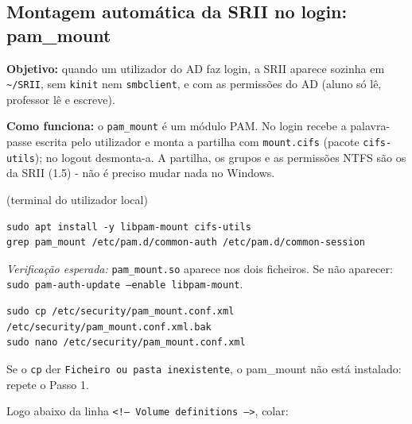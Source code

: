 
\subsection[Montagem automática da SRII no login: pam\_mount]{Montagem automática da SRII no login: pam\_mount}


\textbf{Objetivo:} quando um utilizador do AD faz login, a SRII aparece sozinha em \texttt{\textasciitilde{}/\allowbreak{}SRII}, sem \texttt{kinit} nem \texttt{smbclient}, e com as permissões do AD (aluno só lê, professor lê e escreve).

\begin{simplesbox}
\textbf{Como funciona:} o \texttt{pam\_mount} é um módulo PAM. No login recebe a palavra-passe escrita pelo utilizador e monta a partilha com \texttt{mount.cifs} (pacote \texttt{cifs-utils}); no logout desmonta-a. A partilha, os grupos e as permissões NTFS são os da SRII (1.5) - não é preciso mudar nada no Windows.
\end{simplesbox}

 (terminal do utilizador local)

\begin{lstlisting}[style=bashstyle]
sudo apt install -y libpam-mount cifs-utils
grep pam_mount /etc/pam.d/common-auth /etc/pam.d/common-session
\end{lstlisting}

\emph{Verificação esperada:} \texttt{pam\_mount.so} aparece nos dois ficheiros. Se não aparecer: \texttt{sudo pam-auth-update --enable libpam-mount}.


\begin{lstlisting}[style=bashstyle]
sudo cp /etc/security/pam_mount.conf.xml /etc/security/pam_mount.conf.xml.bak
sudo nano /etc/security/pam_mount.conf.xml
\end{lstlisting}

Se o \texttt{cp} der \texttt{Ficheiro ou pasta inexistente}, o pam\_mount não está instalado: repete o Passo 1.


Logo abaixo da linha \texttt{\textless{}!-- Volume definitions --\textgreater{}}, colar:

